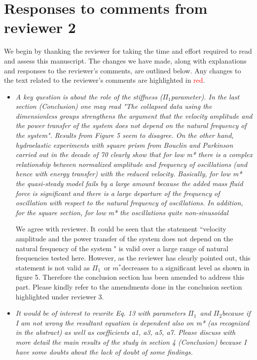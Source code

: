 \documentclass[]{article}
\newcommand{\mstar}{\ensuremath{m^{*}}}
\newcommand{\massstiff}{\ensuremath{\Pi_1}}
\newcommand{\massdamp}{\ensuremath{\Pi_2}}
\begin{document}
\section*{Responses to comments from reviewer 2}

We begin by thanking the reviewer for taking the time and effort
required to read and assess this manuscript. The changes we have made, along with explanations and
responses to the reviewer's comments, are outlined below. Any changes to the text related to the reviewer's comments are highlighted in
\textcolor{red}{red}.

\begin{itemize}
	\item \emph{ A key question is about the role of the stiffness (\massstiff parameter). In the last section (Conclusion) one may read "The collapsed data using the dimensionless groups strengthens the argument that the velocity amplitude and the power transfer of the system does not depend on the natural frequency of the system". Results from Figure 5 seem to disagree. On the other hand, hydroelastic experiments with square prism from Bouclin and Parkinson carried out in the decade of 70  clearly show that for low m* there is a complex relationship between normalized amplitude and frequency of oscillations (and hence with energy transfer) with the reduced velocity. Basically, for low m* the quasi-steady model fails by a large amount because the added mass fluid force is significant and there is a large departure of the frequency of oscillation with respect to the natural frequency of oscillations. In addition, for the square section, for low m* the oscillations quite non-sinusoidal}
	
	We agree with reviewer. It could be seen that the statement ``velocity amplitude and the power transfer of the system does not depend on the natural frequency of the system " is valid over a large range of natural frequencies tested here. However, as the reviewer has clearly pointed out, this statement is not valid as \massstiff \ or \mstar decreases to a significant level as shown in figure 5. Therefore the conclusion section has been amended to address this part. Please kindly refer to the amendments done in the conclusion section highlighted under reviewer 3.     
	
	
	\item \emph{It would be of interest to rewrite Eq. 13 with parameters \massstiff \ and \massdamp because if I am not wrong the resultant equation is dependent also on m* (as recognized in the abstract) as well as coefficients a1, a3, a5, a7. Please discuss with more detail the main results of the study in section 4 (Conclusion) because I have some doubts about the lack of doubt of some findings.}
	

\end{itemize}
\end{document}
